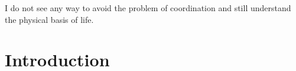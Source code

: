 



\begin{savequote}[8cm]

  I do not see any way to avoid the problem of coordination and still understand the physical basis of life.

\end{savequote}



\chapter{\label{chap:intro}Introduction}



\minitoc





